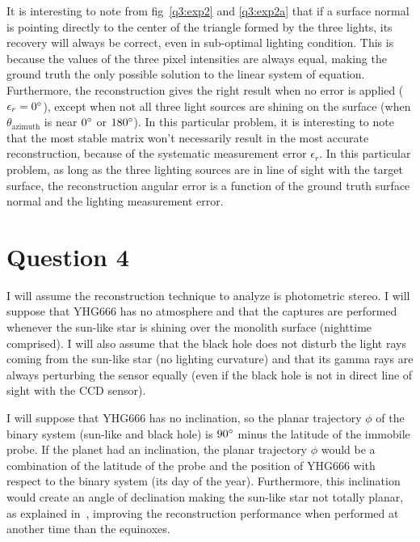 \documentclass{report}
\begin{document}

It is interesting to note from fig~\ref{q3:exp2} and \ref{q3:exp2a} that if a surface normal is pointing directly to the center of the triangle formed by the three lights, its recovery will always be correct, even in sub-optimal lighting condition. This is because the values of the three pixel intensities are always equal, making the ground truth the only possible solution to the linear system of equation. Furthermore, the reconstruction gives the right result when no error is applied ($\epsilon_r = 0\degree$), except when not all three light sources are shining on the surface (when $\theta_{\text{azimuth}}$ is near $0\degree$ or $180\degree$). In this particular problem, it is interesting to note that the most stable matrix won't necessarily result in the most accurate reconstruction, because of the systematic measurement error $\epsilon_r$. In this particular problem, as long as the three lighting sources are in line of sight with the target surface, the reconstruction angular error is a function of the ground truth surface normal and the lighting measurement error.


\FloatBarrier
\section{Question 4}

I will assume the reconstruction technique to analyze is photometric stereo. I will suppose that YHG666 has no atmosphere and that the captures are performed whenever the sun-like star is shining over the monolith surface (nighttime comprised). I will also assume that the black hole does not disturb the light rays coming from the sun-like star (no lighting curvature) and that its gamma rays are always perturbing the sensor equally (even if the black hole is not in direct line of sight with the CCD sensor).

I will suppose that YHG666 has no inclination, so the planar trajectory $\phi$ of the binary system (sun-like and black hole) is $90\degree$ minus the latitude of the immobile probe. If the planet had an inclination, the planar trajectory $\phi$ would be a combination of the latitude of the probe and the position of YHG666 with respect to the binary system (its day of the year). Furthermore, this inclination would create an angle of declination making the sun-like star not totally planar, as explained in~\cite{shen-pg-14}, improving the reconstruction performance when performed at another time than the equinoxes.
\end{document}

